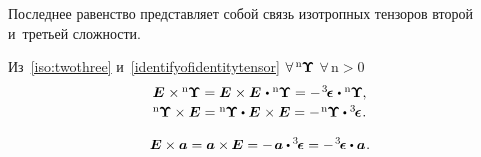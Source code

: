 \begin{otherlanguage}{russian}
\vspace{-0.5em} \noindent Последнее равенство представляет собой связь изотропных тензоров второй и~третьей сложности.

Из~\eqref{iso:twothree} и~\eqref{identifyofidentitytensor} ${\forall \, {^\mathrm{n}\hspace{-0.12ex}\bm{\Upsilon}}}$ ${\forall \,\mathrm{n \!>\! 0}}$
\vspace{0.2em}\begin{equation}\begin{array}{c}
\bm{E} \hspace{0.1ex} \times \hspace{-0.1ex} {^\mathrm{n}\hspace{-0.12ex}\bm{\Upsilon}} = \bm{E} \hspace{0.1ex} \times \bm{E} \hspace{0.2ex} \dotp {^\mathrm{n}\hspace{-0.12ex}\bm{\Upsilon}} = - \hspace{0.2ex} \levicivitatensor \hspace{0.1ex} \dotp {^\mathrm{n}\hspace{-0.12ex}\bm{\Upsilon}} \hspace{-0.1ex},\\[0.2em]
{^\mathrm{n}\hspace{-0.12ex}\bm{\Upsilon}} \times \bm{E} = {^\mathrm{n}\hspace{-0.12ex}\bm{\Upsilon}} \dotp \hspace{.05ex} \bm{E} \hspace{0.1ex} \times \bm{E} = - \hspace{0.2ex} {^\mathrm{n}\hspace{-0.12ex}\bm{\Upsilon}} \dotp \levicivitatensor \hspace{0.1ex}.
\end{array}\end{equation}


\nopagebreak\vspace{-0.2em}\begin{equation}
\bm{E} \times \bm{a} = \bm{a} \times \hspace{-0.1ex} \bm{E} = - \hspace{.25ex} \bm{a} \dotp \hspace{-0.1ex} \levicivitatensor = - \hspace{.2ex} \levicivitatensor \dotp \bm{a} \hspace{.1ex}.
\end{equation}


\end{otherlanguage}
